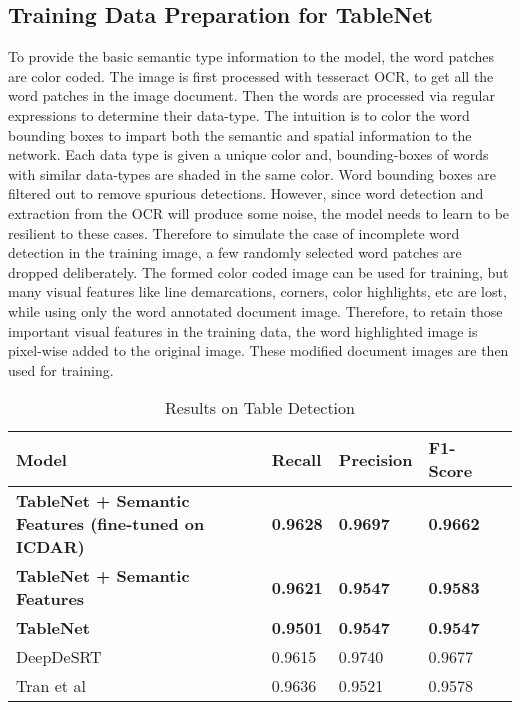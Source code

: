 \documentclass[conference]{IEEEtran}
\begin{document}
\subsection{Training Data Preparation for TableNet}
\label{sec:TraningData}
To provide the basic semantic type information to the model, the word patches are color coded. The image is first processed with tesseract OCR, to get all the word patches in the image document. Then the words are processed via regular expressions to determine their data-type. The intuition is to color the word bounding boxes to impart both the semantic and spatial information to the network. Each data type is given a unique color and, bounding-boxes of words with similar data-types are shaded in the same color. Word bounding boxes are filtered out to remove spurious detections. However, since word detection and extraction from the OCR will produce some noise, the model needs to learn to be resilient to these cases. Therefore to simulate the case of incomplete word detection in the training image, a few randomly selected word patches are dropped deliberately. The formed color coded image can be used for training, but many visual features like line demarcations, corners, color highlights, etc are lost, while using only the word annotated document image. Therefore, to retain those important visual features in the training data, the word highlighted image is pixel-wise added to the original image. These modified document images are then used for training. 


\renewcommand{\arraystretch}{1.5}


\begin{table}
\centering

\begin{tabular}{|M{3.7cm}||M{1cm}|M{1cm}|M{1.3cm}|M{1.3cm}|  }
\hline
Model &  Recall & Precision & F1-Score\\
\hline
\textbf{TableNet + Semantic Features (fine-tuned on ICDAR)}  &\textbf{0.9628} & \textbf{0.9697} & \textbf{0.9662}\\
\hline
\textbf{TableNet + Semantic Features} & \textbf{0.9621} & \textbf{0.9547} & \textbf{0.9583}\\
\hline
\textbf{TableNet} & \textbf{0.9501} & \textbf{0.9547} & \textbf{0.9547}\\
\hline
DeepDeSRT \cite{schreiber} & 0.9615 & 0.9740 & 0.9677 \\
\hline
Tran et al \cite{tran2015table} & 0.9636 & 0.9521 & 0.9578 \\
 \hline
\end{tabular}
\caption{Results on Table Detection} \label{tab:sometab1}
\end{table}
\end{document}
